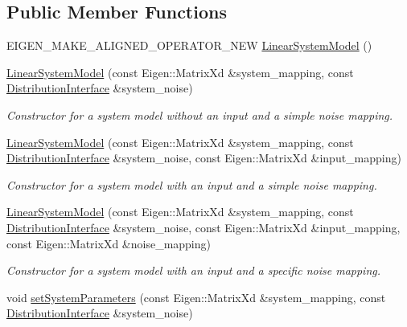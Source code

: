 \subsection*{Public Member Functions}
\begin{DoxyCompactItemize}
\item 
E\+I\+G\+E\+N\+\_\+\+M\+A\+K\+E\+\_\+\+A\+L\+I\+G\+N\+E\+D\+\_\+\+O\+P\+E\+R\+A\+T\+O\+R\+\_\+\+N\+EW \hyperlink{classrefill_1_1LinearSystemModel_a3e65d1c380d1c9abf807ca3a4814043e}{Linear\+System\+Model} ()
\item 
\hyperlink{classrefill_1_1LinearSystemModel_ab153e34ae8b09eedf442841f744851e6}{Linear\+System\+Model} (const Eigen\+::\+Matrix\+Xd \&system\+\_\+mapping, const \hyperlink{classrefill_1_1DistributionInterface}{Distribution\+Interface} \&system\+\_\+noise)
\begin{DoxyCompactList}\small\item\em Constructor for a system model without an input and a simple noise mapping. \end{DoxyCompactList}\item 
\hyperlink{classrefill_1_1LinearSystemModel_a48ede1019cfda95201e84371562d376b}{Linear\+System\+Model} (const Eigen\+::\+Matrix\+Xd \&system\+\_\+mapping, const \hyperlink{classrefill_1_1DistributionInterface}{Distribution\+Interface} \&system\+\_\+noise, const Eigen\+::\+Matrix\+Xd \&input\+\_\+mapping)
\begin{DoxyCompactList}\small\item\em Constructor for a system model with an input and a simple noise mapping. \end{DoxyCompactList}\item 
\hyperlink{classrefill_1_1LinearSystemModel_a35cfa05a9104d41f924acd5a9b183deb}{Linear\+System\+Model} (const Eigen\+::\+Matrix\+Xd \&system\+\_\+mapping, const \hyperlink{classrefill_1_1DistributionInterface}{Distribution\+Interface} \&system\+\_\+noise, const Eigen\+::\+Matrix\+Xd \&input\+\_\+mapping, const Eigen\+::\+Matrix\+Xd \&noise\+\_\+mapping)
\begin{DoxyCompactList}\small\item\em Constructor for a system model with an input and a specific noise mapping. \end{DoxyCompactList}\item 
void \hyperlink{classrefill_1_1LinearSystemModel_aa1644a0a0d363634205eaa7d1e1bfea8}{set\+System\+Parameters} (const Eigen\+::\+Matrix\+Xd \&system\+\_\+mapping, const \hyperlink{classrefill_1_1DistributionInterface}{Distribution\+Interface} \&system\+\_\+noise)

\end{DoxyCompactItemize}
